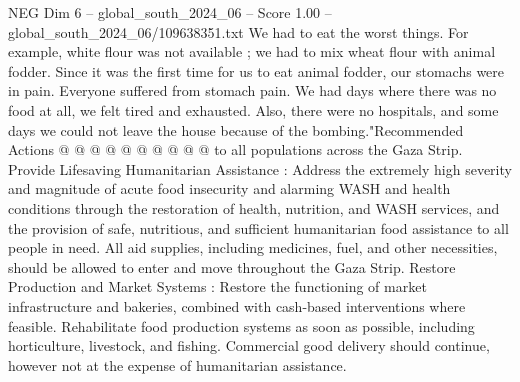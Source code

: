 \begin{textsample}{NEG Dim 6 – global\_south\_2024\_06 – Score 1.00 – global\_south\_2024\_06/109638351.txt}
We had to eat the worst things.
For example, white flour was not available ; we had to mix wheat flour with animal fodder.
Since it was the first time for us to eat animal fodder, our stomachs were in pain.
Everyone suffered from stomach pain.
We had days where there was no food at all, we felt tired and exhausted.
Also, there were no hospitals, and some days we could not leave the house because of the bombing."Recommended Actions @ @ @ @ @ @ @ @ @ @ to all populations across the Gaza Strip.
Provide Lifesaving Humanitarian Assistance : Address the extremely high severity and magnitude of acute food insecurity and alarming WASH and health conditions through the restoration of health, nutrition, and WASH services, and the provision of safe, nutritious, and sufficient humanitarian food assistance to all people in need.
All aid supplies, including medicines, fuel, and other necessities, should be allowed to enter and move throughout the Gaza Strip.
Restore Production and Market Systems : Restore the functioning of market infrastructure and bakeries, combined with cash-based interventions where feasible.
Rehabilitate food production systems as soon as possible, including horticulture, livestock, and fishing.
Commercial good delivery should continue, however not at the expense of humanitarian assistance.

\end{textsample}
